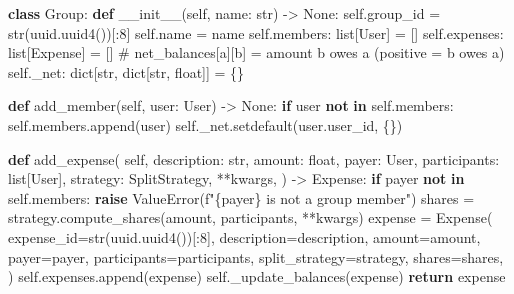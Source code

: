 \documentclass[11pt]{article}
\newenvironment{Shaded}{\begin{snugshade}}{\end{snugshade}}
\newcommand{\BuiltInTok}[1]{\textcolor[rgb]{0.50,0.55,0.55}{#1}}
\newcommand{\CommentTok}[1]{\textcolor[rgb]{0.48,0.49,0.49}{#1}}
\newcommand{\ControlFlowTok}[1]{\textcolor[rgb]{0.99,0.74,0.29}{\textbf{#1}}}
\newcommand{\DecValTok}[1]{\textcolor[rgb]{0.96,0.45,0.00}{#1}}
\newcommand{\FunctionTok}[1]{\textcolor[rgb]{0.56,0.27,0.68}{#1}}
\newcommand{\KeywordTok}[1]{\textcolor[rgb]{0.81,0.81,0.76}{\textbf{#1}}}
\newcommand{\NormalTok}[1]{\textcolor[rgb]{0.81,0.81,0.76}{#1}}
\newcommand{\OperatorTok}[1]{\textcolor[rgb]{0.81,0.81,0.76}{#1}}
\newcommand{\PreprocessorTok}[1]{\textcolor[rgb]{0.15,0.68,0.38}{#1}}
\newcommand{\SpecialCharTok}[1]{\textcolor[rgb]{0.24,0.68,0.91}{#1}}
\newcommand{\SpecialStringTok}[1]{\textcolor[rgb]{0.85,0.27,0.33}{#1}}
\newcommand{\VariableTok}[1]{\textcolor[rgb]{0.15,0.68,0.68}{#1}}
\begin{document}
\begin{Shaded}
\begin{Highlighting}[]
\KeywordTok{class}\NormalTok{ Group:}
    \KeywordTok{def} \FunctionTok{\_\_init\_\_}\NormalTok{(}\VariableTok{self}\NormalTok{, name: }\BuiltInTok{str}\NormalTok{) }\OperatorTok{{-}\textgreater{}} \VariableTok{None}\NormalTok{:}
        \VariableTok{self}\NormalTok{.group\_id }\OperatorTok{=} \BuiltInTok{str}\NormalTok{(uuid.uuid4())[:}\DecValTok{8}\NormalTok{]}
        \VariableTok{self}\NormalTok{.name }\OperatorTok{=}\NormalTok{ name}
        \VariableTok{self}\NormalTok{.members: }\BuiltInTok{list}\NormalTok{[User] }\OperatorTok{=}\NormalTok{ []}
        \VariableTok{self}\NormalTok{.expenses: }\BuiltInTok{list}\NormalTok{[Expense] }\OperatorTok{=}\NormalTok{ []}
        \CommentTok{\# net\_balances[a][b] = amount b owes a (positive = b owes a)}
        \VariableTok{self}\NormalTok{.\_net: }\BuiltInTok{dict}\NormalTok{[}\BuiltInTok{str}\NormalTok{, }\BuiltInTok{dict}\NormalTok{[}\BuiltInTok{str}\NormalTok{, }\BuiltInTok{float}\NormalTok{]] }\OperatorTok{=}\NormalTok{ \{\}}

    \KeywordTok{def}\NormalTok{ add\_member(}\VariableTok{self}\NormalTok{, user: User) }\OperatorTok{{-}\textgreater{}} \VariableTok{None}\NormalTok{:}
        \ControlFlowTok{if}\NormalTok{ user }\KeywordTok{not} \KeywordTok{in} \VariableTok{self}\NormalTok{.members:}
            \VariableTok{self}\NormalTok{.members.append(user)}
            \VariableTok{self}\NormalTok{.\_net.setdefault(user.user\_id, \{\})}

    \KeywordTok{def}\NormalTok{ add\_expense(}
        \VariableTok{self}\NormalTok{,}
\NormalTok{        description: }\BuiltInTok{str}\NormalTok{,}
\NormalTok{        amount: }\BuiltInTok{float}\NormalTok{,}
\NormalTok{        payer: User,}
\NormalTok{        participants: }\BuiltInTok{list}\NormalTok{[User],}
\NormalTok{        strategy: SplitStrategy,}
        \OperatorTok{**}\NormalTok{kwargs,}
\NormalTok{    ) }\OperatorTok{{-}\textgreater{}}\NormalTok{ Expense:}
        \ControlFlowTok{if}\NormalTok{ payer }\KeywordTok{not} \KeywordTok{in} \VariableTok{self}\NormalTok{.members:}
            \ControlFlowTok{raise} \PreprocessorTok{ValueError}\NormalTok{(}\SpecialStringTok{f"}\SpecialCharTok{\{}\NormalTok{payer}\SpecialCharTok{\}}\SpecialStringTok{ is not a group member"}\NormalTok{)}
\NormalTok{        shares }\OperatorTok{=}\NormalTok{ strategy.compute\_shares(amount, participants, }\OperatorTok{**}\NormalTok{kwargs)}
\NormalTok{        expense }\OperatorTok{=}\NormalTok{ Expense(}
\NormalTok{            expense\_id}\OperatorTok{=}\BuiltInTok{str}\NormalTok{(uuid.uuid4())[:}\DecValTok{8}\NormalTok{],}
\NormalTok{            description}\OperatorTok{=}\NormalTok{description,}
\NormalTok{            amount}\OperatorTok{=}\NormalTok{amount,}
\NormalTok{            payer}\OperatorTok{=}\NormalTok{payer,}
\NormalTok{            participants}\OperatorTok{=}\NormalTok{participants,}
\NormalTok{            split\_strategy}\OperatorTok{=}\NormalTok{strategy,}
\NormalTok{            shares}\OperatorTok{=}\NormalTok{shares,}
\NormalTok{        )}
        \VariableTok{self}\NormalTok{.expenses.append(expense)}
        \VariableTok{self}\NormalTok{.\_update\_balances(expense)}
        \ControlFlowTok{return}\NormalTok{ expense}


\end{Highlighting}
\end{Shaded}
\end{document}
